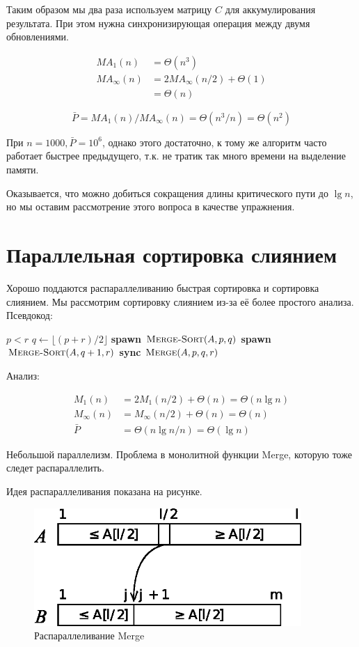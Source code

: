 \documentclass[a4paper,11pt]{article}
\begin{document}
Таким образом мы два раза используем матрицу $C$ для аккумулирования результата.
При этом нужна синхронизирующая операция между двумя обновлениями.

\begin{align*}
  MA_1(n) &= \Theta(n^3) \\
  MA_{\infty}(n) &= 2MA_{\infty}(n/2) + \Theta(1) \\
    &= \Theta(n)
\end{align*}

$$
\bar{P} = MA_1(n)/MA_{\infty}(n) = \Theta(n^3 / n) = \Theta(n^2)
$$

При $n = 1000, \bar{P} = 10^6$, однако этого достаточно, к тому же алгоритм
часто работает быстрее предыдущего, т.к. не тратик так много времени на
выделение памяти.

Оказывается, что можно добиться сокращения длины критического пути до $\lg n$,
но мы оставим рассмотрение этого вопроса в качестве упражнения.


\section{Параллельная сортировка слиянием}

Хорошо поддаются распараллеливанию быстрая сортировка и сортировка слиянием. Мы
рассмотрим сортировку слиянием из-за её более простого анализа. Псевдокод:

\begin{codebox}
\li \If $p < r$
\li \Then $q \gets \lfloor (p + r) / 2\rfloor$
\li \textbf{spawn} $\textnormal{\scshape Merge-Sort}(A, p, q)$
\li \textbf{spawn} $\textnormal{\scshape Merge-Sort}(A, q + 1, r)$
    \End
\li \textbf{sync}
\li $\textnormal{\scshape Merge}(A, p, q, r)$
\li \Return
\end{codebox}

Анализ:

\begin{align*}
  M_1(n) &= 2M_1(n/2) + \Theta(n) = \Theta(n \lg n) \\
  M_{\infty}(n) &= M_{\infty}(n/2) + \Theta(n) = \Theta(n) \\
  \bar{P} &= \Theta(n \lg n / n) = \Theta(\lg n)
\end{align*}

Небольшой параллелизм. Проблема в монолитной функции Merge, которую тоже следет
распараллелить.

Идея распараллеливания показана на рисунке.

\begin{figure}[ht]
  \centering
  \includegraphics[width=4in]{lecture21/merge-sort.eps}
  \caption{Распараллеливание Merge}
  \label{fig:merge-sort}
\end{figure}
\end{document}
